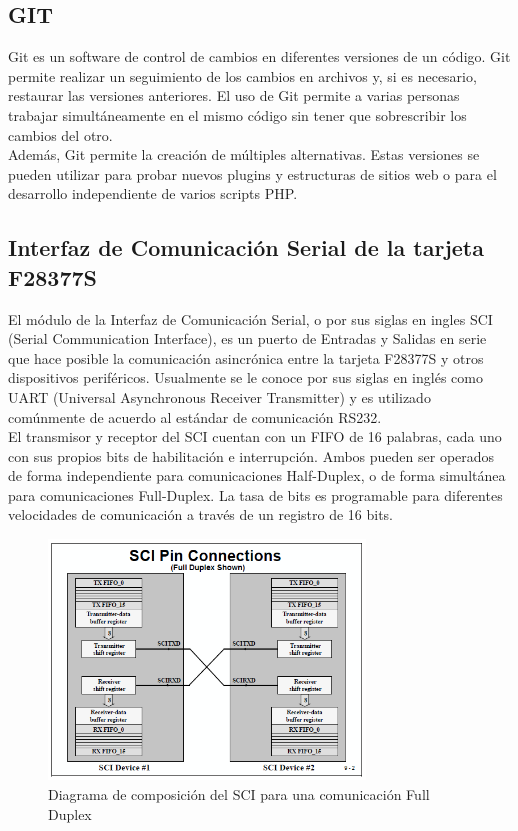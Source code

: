 \documentclass[12pt, letterpaper]{article}
\begin{document}
\subsection{GIT}
Git es un software de control de cambios en diferentes versiones de un código. Git permite realizar un seguimiento de los cambios en archivos y, si es necesario, restaurar las versiones anteriores. El uso de Git permite a varias personas trabajar simultáneamente en el mismo código sin tener que sobrescribir los cambios del otro.\\
Además, Git permite la creación de múltiples alternativas. Estas versiones se pueden utilizar para probar nuevos plugins y estructuras de sitios web o para el desarrollo independiente de varios scripts PHP.

\subsection{Interfaz de Comunicación Serial de la tarjeta F28377S}
El módulo de la Interfaz de Comunicación Serial, o por sus siglas en ingles SCI (Serial Communication Interface), es un puerto de Entradas y Salidas en serie que hace posible la comunicación asincrónica entre la tarjeta F28377S y otros dispositivos periféricos. Usualmente se le conoce por sus siglas en inglés como UART (Universal Asynchronous Receiver Transmitter) y es utilizado comúnmente de acuerdo al estándar de comunicación RS232.\\
El transmisor y receptor del SCI cuentan con un FIFO de 16 palabras, cada uno con sus propios bits de habilitación e interrupción. Ambos pueden ser operados de forma independiente para comunicaciones Half-Duplex, o de forma simultánea para comunicaciones Full-Duplex. La tasa de bits es programable para diferentes velocidades de comunicación a través de un registro de 16 bits.

\begin{figure}[H]
    \centering
    \includegraphics[width=0.75\textwidth]{img/intro/SCI_PIN.png}
    \caption{Diagrama de composición del SCI para una comunicación Full Duplex}
\end{figure}
\pagebreak
\end{document}
